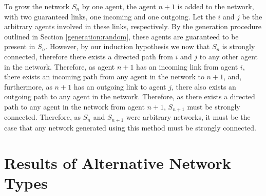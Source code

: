 \documentclass[a4paper, 12pt]{report}
\begin{document}
To grow the network $S_n$ by one agent, the agent $n+1$ is added to the network, with two guaranteed links, one incoming and one outgoing. Let the $i$ and $j$ be the arbitrary agents involved in these links, respectively. By the generation procedure outlined in Section \ref{generation:random}, these agents are guaranteed to be present in $S_n$. However, by our induction hypothesis we now that $S_n$ is strongly connected, therefore there exists a directed path from $i$ and $j$ to any other agent in the network. Therefore, as agent $n+1$ has an incoming link from agent $i$, there exists an incoming path from any agent in the network to $n+1$, and, furthermore, as $n+1$ has an outgoing link to agent $j$, there also exists an outgoing path to any agent in the network. Therefore, as there exists a directed path to any agent in the network from agent $n+1$, $S_{n+1}$ must be strongly connected.\newline
Therefore, as $S_n$ and $S_{n+1}$ were arbitrary networks, it must be the case that any network generated using this method must be strongly connected.\newline

\section{Results of Alternative Network Types}
\label{results:appendix}
\end{document}
